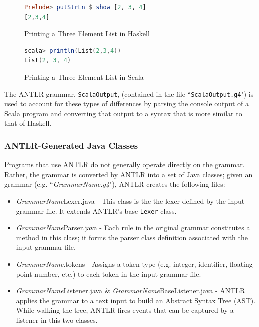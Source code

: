 \documentclass{report}
\begin{document}
\begin{figure}[H]
\begin{mdframed}
\begin{lstlisting}[language=Haskell]
Prelude> putStrLn $ show [2, 3, 4]
[2,3,4]
\end{lstlisting}
\end{mdframed}
\caption{Printing a Three Element List in Haskell}\label{fig:printListHaskell}
\end{figure}

\begin{figure}[H]
\begin{mdframed}
\begin{lstlisting}[language=Scala]
scala> println(List(2,3,4))
List(2, 3, 4)
\end{lstlisting}
\end{mdframed}
\caption{Printing a Three Element List in Scala}\label{fig:printListScala}
\end{figure}

The ANTLR grammar, \texttt{ScalaOutput}, (contained in the file ``\texttt{ScalaOutput.g4}") is used to account for these types of differences by parsing the console output of a Scala program and converting that output to a syntax that is more similar to that of Haskell.

\subsubsection{ANTLR-Generated Java Classes}

Programs that use ANTLR do not generally operate directly on the grammar.  Rather, the grammar is converted by ANTLR into a set of Java classes; given an  grammar (e.g. ``\emph{GrammarName.g4}"),  ANTLR creates the following files:

\begin{itemize}
	\item \emph{GrammarName}Lexer.java - This class is the the lexer defined by the input grammar file.  It extends ANTLR's base \texttt{Lexer} class.
	
	\item \emph{GrammarName}Parser.java - Each rule in the original grammar constitutes a method in this class; it forms the parser class definition associated with the input grammar file.
	
	\item \emph{GrammarName}.tokens - Assigns a token type (e.g. integer, identifier, floating point number, etc.) to each token in the input grammar file.
	
	\item \emph{GrammarName}Listener.java \& \emph{GrammarName}BaseListener.java - ANTLR applies the grammar to a text input to build an Abstract Syntax Tree (AST).  While walking the tree, ANTLR fires events that can be captured by a listener in this two classes\cite{antlrDefinitiveReference}.
	
\end{itemize}
\end{document}
